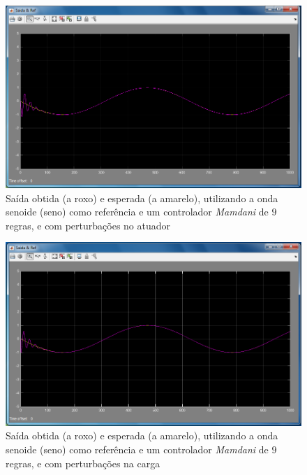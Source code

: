 \documentclass{article}
\begin{document}
\begin{figure}[h]
  \centering
      \includegraphics[scale=0.3]{Images/Mamdani_9_sin_actuator.png}
  \caption{Saída obtida (a roxo) e esperada (a amarelo), utilizando a onda senoide (seno) como referência e um controlador \emph{Mamdani} de $9$ regras, e com perturbações no atuador}
\end{figure}

\begin{figure}[h]
  \centering
      \includegraphics[scale=0.3]{Images/Mamdani_9_sin_charge.png}
  \caption{Saída obtida (a roxo) e esperada (a amarelo), utilizando a onda senoide (seno) como referência e um controlador \emph{Mamdani} de $9$ regras, e com perturbações na carga}
\end{figure}
\end{document}
